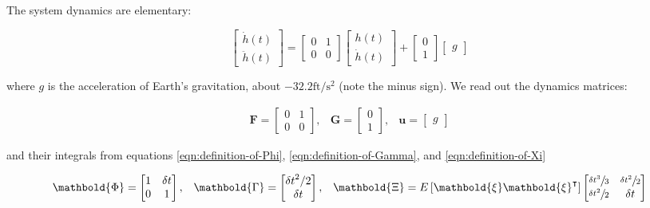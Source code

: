 \documentclass[10pt,oneside,x11names]{article}
\begin{document}
\noindent The system dynamics are elementary:

\begin{equation*}
\begin{bmatrix} \dot { h } (t) \\ \ddot { h } (t) \end{bmatrix}
=
\begin{bmatrix}
0 & 1 \\
0 & 0
\end{bmatrix}
\begin{bmatrix} h(t) \\ \dot { h } (t) \end{bmatrix}
+
\begin{bmatrix} 0 \\ 1 \end{bmatrix}
\begin{bmatrix} g \end{bmatrix}
\end{equation*}

\noindent where \(g\) is the acceleration of Earth's gravitation, about
\(-32.2\textrm{ft}/{\textrm{s}}^2\) (note the minus sign). We read out the
dynamics matrices:

\begin{equation*}
\begin{matrix}
\mathbold{F} = \begin{bmatrix}0 & 1 \\0 & 0\end{bmatrix}, &
\mathbold{G} = \begin{bmatrix} 0 \\ 1 \end{bmatrix}, &
\mathbold{u} = \begin{bmatrix} g \end{bmatrix}
\end{matrix}
\end{equation*}

\noindent and their integrals from equations \ref{eqn:definition-of-Phi},
\ref{eqn:definition-of-Gamma}, and \ref{eqn:definition-of-Xi}

\begin{equation*}
\begin{matrix}
\mathbold{\Phi} =
\begin{bmatrix}
1  & \delta t  \\
0  & 1 
\end{bmatrix}, &
\mathbold{\Gamma} = 
\begin{bmatrix}
{{\delta t}^2}/{2}  \\
\delta t
\end{bmatrix}, &
\mathbold{\Xi} =
E\left[\mathbold{ \xi  }\mathbold{ \xi  }^{ \intercal  }\right]
\begin{bmatrix}
\sfrac { { \delta t }^{ 3 } }{ 3 }  & \sfrac { { \delta t }^{ 2 } }{ 2 }  \\
\sfrac { { \delta t }^{ 2 } }{ 2 }  & \delta t
\end{bmatrix}
\end{matrix}
\end{equation*}
\end{document}
